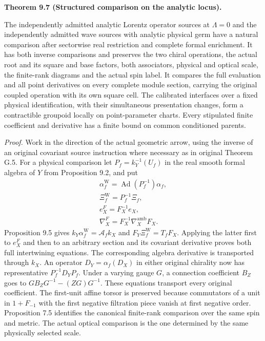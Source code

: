 \documentclass[
  english,
  11pt,
  reqno]{amsart}
\makeatletter
\newcommand{\pandocstatementheading}[1]{%
  \par\if@nobreak\else
    \addpenalty{\@beginparpenalty}%
    \addvspace{.5\baselineskip plus .2\baselineskip minus .2\baselineskip}%
  \fi
  {\normalfont\bfseries #1\par}%
  \nobreak\@afterindenttrue\@afterheading
}
\makeatother
\begin{document}
\pandocstatementheading{\leavevmode{}\label{thm:analytic-structured-wave-comparison}Theorem 9.7 (Structured comparison on the analytic locus).}

The independently admitted analytic Lorentz operator sources at
\(\Lambda=0\) and the independently admitted wave sources with analytic
physical germ have a natural comparison after sectorwise real
restriction and complete formal enrichment. It has both inverse
comparisons and preserves the two chiral operations, the actual root and
its square and base factors, both associators, physical and optical
scale, the finite-rank diagrams and the actual spin label. It compares
the full evaluation and all point derivatives on every complete module
section, carrying the original coupled operation with its own square
cell. The calibrated interfaces over a fixed physical identification,
with their simultaneous presentation changes, form a contractible
groupoid locally on point-parameter charts. Every stipulated finite
coefficient and derivative has a finite bound on common conditioned
parents.

\emph{Proof.} Work in the direction of the actual geometric arrow, using
the inverse of an original covariant source instruction where necessary
as in original Theorem G.5. For a physical comparison let
\(P_f=k_Y^{-1}(U_f)\) in the real smooth formal algebra of \(Y\) from
Proposition 9.2, and put%
 \[
\begin{gathered}
\alpha_f^{\mathrm W}=\operatorname{Ad}(P_f^{-1})\alpha_f, \\
\Xi_f^{\mathrm W}=P_f^{-1}\Xi_f, \\
e_X^F=F_X^{-1}e_X, \\
\nabla_X^F=F_X^{-1}\nabla_X^{\mathrm{amb}}F_X.
\end{gathered}
\] Proposition 9.5 gives \(k_Y\alpha_f^{\mathrm W}=\mathcal A_f k_X\)
and \(F_Y\Xi_f^{\mathrm W}=T_fF_X\). Applying the latter first to
\(e_X^F\) and then to an arbitrary section and its covariant derivative
proves both full intertwining equations. The corresponding algebra
derivative is transported through \(k_X\). An operator
\(D_Y=\alpha_f(D_X)\) in either original chirality now has
representative \(P_f^{-1}D_Y P_f\). Under a varying gauge \(G\), a
connection coefficient \(B_Z\) goes to \(GB_ZG^{-1}-(ZG)G^{-1}\). These
equations transport every original coefficient. The first-unit affine
torsor is preserved because commutators of a unit in \(1+F_{-1}\) with
the first negative filtration piece vanish at first negative order.
Proposition 7.5 identifies the canonical finite-rank comparison over the
same spin and metric. The actual optical comparison is the one
determined by the same physically selected scale.
\end{document}
